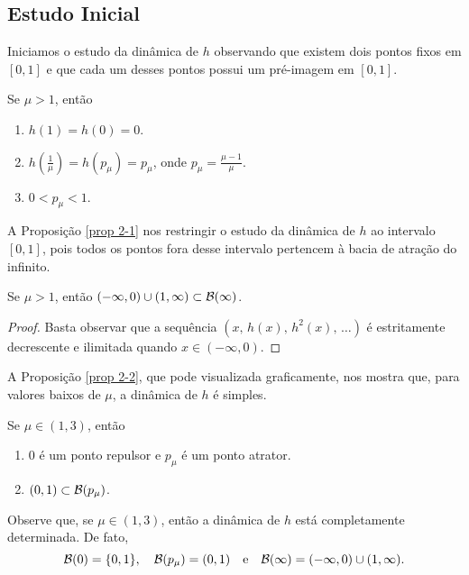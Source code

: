 \subsection{Estudo Inicial}

Iniciamos o estudo da dinâmica de $h$ observando que existem dois pontos fixos em $[0, 1]$ e que cada um desses pontos possui um pré-imagem em $[0, 1]$.

\begin{proposition}
Se $\mu > 1$, então
\begin{enumerate}
\item $h(1) = h(0) = 0$.
\item $h(\frac{1}{\mu}) = h(p_\mu) = p_\mu$, onde $p_\mu = \frac{\mu-1}{\mu}$.
\item $0 < p_\mu < 1$.
\end{enumerate}
\end{proposition}

A Proposição \ref{prop 2-1} nos restringir o estudo da dinâmica de $h$ ao intervalo $[0, 1]$, pois todos os pontos fora desse intervalo pertencem à bacia de atração do infinito.

\begin{proposition}\label{prop 2-1}
Se $\mu > 1$, então $(-\infty, 0) \cup (1, \infty) \subset \mathcal{B}(\infty)$.
\end{proposition}

\begin{proof}
Basta observar que a sequência $(x, \, h(x), \, h^2(x), \, \dots)$ é estritamente decrescente e ilimitada quando $x \in (-\infty, 0)$.
\end{proof}

A Proposição \ref{prop 2-2}, que pode visualizada graficamente, nos mostra que, para valores baixos de $\mu$, a dinâmica de $h$ é simples.

\begin{proposition}\label{prop 2-2}
Se $\mu \in (1, 3)$, então
\begin{enumerate}
\item $0$ é um ponto repulsor e $p_\mu$ é um ponto atrator.
\item $(0, 1) \subset \mathcal{B}(p_\mu)$.
\end{enumerate}
\end{proposition}

Observe que, se $\mu \in (1, 3)$, então a dinâmica de $h$ está completamente determinada. De fato,
$$\mathcal{B}(0) = \lbrace 0, 1 \rbrace, \quad \mathcal{B}(p_\mu) = (0, 1) \quad \text{e}  \quad \mathcal{B}(\infty) = (-\infty, 0) \cup (1, \infty).$$
